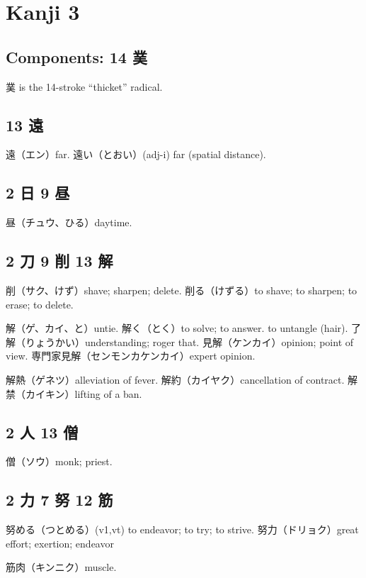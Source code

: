 \chapter{Kanji 3}

\section{Components: 14 菐}

菐 is the 14-stroke ``thicket'' radical.

\section{13 遠}

遠（エン）far.
遠い（とおい）(adj-i) far (spatial distance).

\section{2 日 9 昼}

昼（チュウ、ひる）daytime.

\section{2 刀 9 削 13 解}

削（サク、けず）shave; sharpen; delete.
削る（けずる）to shave; to sharpen; to erase; to delete.

解（ゲ、カイ、と）untie.
解く（とく）to solve; to answer. to untangle (hair).
了解（りょうかい）understanding; roger that.
見解（ケンカイ）opinion; point of view.
専門家見解（センモンカケンカイ）expert opinion.

解熱（ゲネツ）alleviation of fever.
解約（カイヤク）cancellation of contract.
解禁（カイキン）lifting of a ban.

\section{2 人 13 僧}

僧（ソウ）monk; priest.

\section{2 力 7 努 12 筋}

努める（つとめる）(v1,vt) to endeavor; to try; to strive.
努力（ドリョク）great effort; exertion; endeavor

筋肉（キンニク）muscle.

